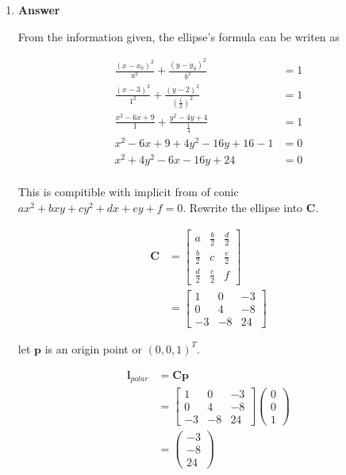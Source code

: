 \documentclass[11pt]{article}
\begin{document}
\begin{enumerate}
\item 
\noindent\textbf{Answer}

From the information given, the ellipse's formula can be writen as

\begin{align*}
\frac{(x-x_0)^2}{a^2} +\frac{(y-y_0)^2}{b^2} &= 1\\
\frac{(x-3)^2}{1^2} +\frac{(y-2)^2}{(\frac{1}{2})^2} &= 1\\
\frac{x^2 - 6x + 9}{1} +\frac{y^2 -4y + 4}{\frac{1}{4}} &= 1\\
x^2 - 6x + 9 + 4y^2 - 16y + 16 - 1 &= 0\\
x^2 + 4y^2 - 6x - 16y + 24 &= 0\\
\end{align*}

This is compitible with implicit from of conic $ax^2 + bxy + cy^2 + dx + ey +f = 0$. Rewrite the ellipse into $\mathbf{C}$.

\begin{align*}
\mathbf{C} &= 
\begin{bmatrix}
a & \frac{b}{2} & \frac{d}{2}\\
\frac{b}{2} & c & \frac{e}{2} \\
\frac{d}{2} & \frac{e}{2} & f
\end{bmatrix} \\
&= 
\begin{bmatrix}
1 & 0 & -3\\
0 & 4 & -8 \\
-3 & -8 & 24
\end{bmatrix}
\end{align*}


let $\mathbf{p}$ is an origin point or $(0,0,1)^T$. 

\begin{align*}
\mathbf{l}_{polar} &= \mathbf{C}\mathbf{p} \\
&= 
\begin{bmatrix}
1 & 0 & -3\\
0 & 4 & -8 \\
-3 & -8 & 24
\end{bmatrix}
\begin{pmatrix}
0\\
0\\
1
\end{pmatrix}\\
&= 
\begin{pmatrix}
-3\\
-8\\
24
\end{pmatrix}\\
\end{align*}


\end{enumerate}
\end{document}
